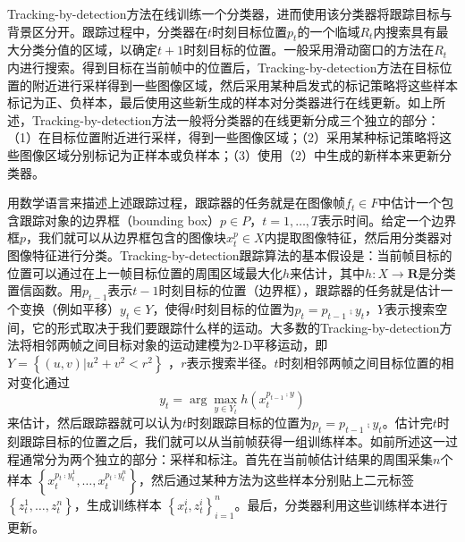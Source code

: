 Tracking-by-detection方法在线训练一个分类器，进而使用该分类器将跟踪目标与背景区分开。跟踪过程中，分类器在$t$时刻目标位置$p_t$的一个临域$R_t$内搜索具有最大分类分值的区域，以确定$t+1$时刻目标的位置。一般采用滑动窗口的方法在$R_t$内进行搜索。得到目标在当前帧中的位置后，Tracking-by-detection方法在目标位置的附近进行采样得到一些图像区域，然后采用某种启发式的标记策略将这些样本标记为正、负样本，最后使用这些新生成的样本对分类器进行在线更新。如上所述，Tracking-by-detection方法一般将分类器的在线更新分成三个独立的部分：（1）在目标位置附近进行采样，得到一些图像区域；（2）采用某种标记策略将这些图像区域分别标记为正样本或负样本；（3）使用（2）中生成的新样本来更新分类器。

用数学语言来描述上述跟踪过程，跟踪器的任务就是在图像帧${f_t} \in F$中估计一个包含跟踪对象的边界框（bounding box）$p \in P$，$t = 1,\dots,T$表示时间。给定一个边界框$p$，我们就可以从边界框包含的图像块$x_t^p \in X$内提取图像特征，然后用分类器对图像特征进行分类。Tracking-by-detection跟踪算法的基本假设是：当前帧目标的位置可以通过在上一帧目标位置的周围区域最大化$h$来估计，其中$h:X\rightarrow\textbf{R}$是分类置信函数。用$p_{t-1}$表示$t-1$时刻目标的位置（边界框），跟踪器的任务就是估计一个变换（例如平移）$y_t \in Y$，使得$t$时刻目标的位置为$p_t=p_{t-1}\comp y_t$，$Y$表示搜索空间，它的形式取决于我们要跟踪什么样的运动。大多数的Tracking-by-detection方法将相邻两帧之间目标对象的运动建模为2-D平移运动，即$Y = \left\{ {(u,v)|{u^2} + {v^2} < {r^2}} \right\}$ ，$r$表示搜索半径。$t$时刻相邻两帧之间目标位置的相对变化通过
\begin{equation}
{y_t} = \arg \mathop {\max }\limits_{y \in {Y_t}} h(x_t^{{p_{t - 1}} \comp y})
\end{equation}
来估计，然后跟踪器就可以认为$t$时刻跟踪目标的位置为${p_t} = {p_{t - 1}} \comp {y_t}$。估计完$t$时刻跟踪目标的位置之后，我们就可以从当前帧获得一组训练样本。如前所述这一过程通常分为两个独立的部分：采样和标注。首先在当前帧估计结果的周围采集$n$个样本
$\left\{ {x_t^{{p_t} \comp y_t^1},\dots,x_t^{{p_t} \comp y_t^n}} \right\}$，然后通过某种方法为这些样本分别贴上二元标签
$\left\{ {z_t^1,\dots,z_t^n} \right\}$，生成训练样本
$\left\{ {x_t^i,z_t^i} \right\}_{i = 1}^n$。最后，分类器利用这些训练样本进行更新。

